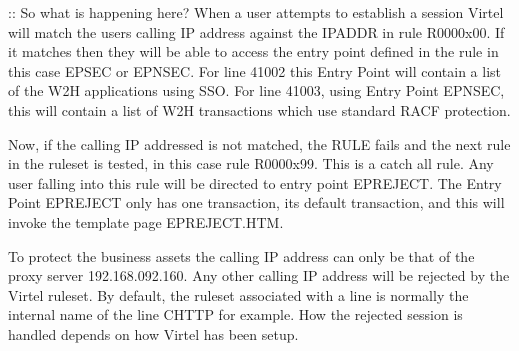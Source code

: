 \documentclass[letterpaper,10pt,english]{sphinxmanual}
\begin{document}
\begin{sphinxVerbatim}[commandchars=\\\{\}]
 
 
                                      
\end{sphinxVerbatim}

\sphinxAtStartPar
::
So what is happening here? When a user attempts to establish a session Virtel will match the users calling IP address against the IPADDR in rule R0000x00. If it matches then they will be able to access the entry point defined in the rule \textendash{} in this case EPSEC or EPNSEC. For line 41002 this Entry Point will contain a list of the W2H applications using SSO.
For line 41003, using Entry Point EPNSEC, this will contain a list of W2H transactions which use standard RACF protection.

\sphinxAtStartPar
Now, if the calling IP addressed is not matched, the RULE fails and the next rule in the ruleset is tested, in this case rule R0000x99. This is a catch all rule. Any user falling into this rule will be directed to entry point EPREJECT. The Entry Point EPREJECT only has one transaction, its default transaction, and this will invoke the template page
EPREJECT.HTM.

\sphinxAtStartPar
To protect the business assets the calling IP address can only be that of the proxy server \sphinxhyphen{} 192.168.092.160. Any other calling IP address will be rejected by the Virtel ruleset. By default, the ruleset associated with a line is normally the internal name of the line \textendash{} C\sphinxhyphen{}HTTP for example. How the rejected session is handled depends on how Virtel has been setup.
\end{document}
